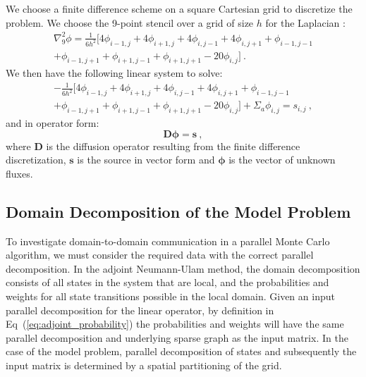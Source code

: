 \documentclass[preprint,11pt]{elsarticle}
\newcommand{\ve}[1]{\ensuremath{\mathbf{#1}}}
\begin{document}
We choose a finite difference scheme on a square Cartesian grid to discretize
the problem. We choose the 9-point stencil over a grid of size $h$ for the
Laplacian \cite{leveque_finite_2007}:
\begin{multline}
  \nabla^2_9\phi = \frac{1}{6h^2}[4 \phi_{i-1,j} + 4 \phi_{i+1,j}
    + 4 \phi_{i,j-1} + 4 \phi_{i,j+1} + \phi_{i-1,j-1}\\ +
    \phi_{i-1,j+1} + \phi_{i+1,j-1} + \phi_{i+1,j+1} - 20
    \phi_{i,j}]\:.
  \label{eq:nine_point_stencil}
\end{multline}
We then have the following linear system to solve:
\begin{multline}
  -\frac{1}{6h^2}[4 \phi_{i-1,j} + 4 \phi_{i+1,j} + 4
    \phi_{i,j-1} + 4 \phi_{i,j+1} + \phi_{i-1,j-1}\\ + \phi_{i-1,j+1}
    + \phi_{i+1,j-1} + \phi_{i+1,j+1} - 20 \phi_{i,j}] + \Sigma_a
  \phi_{i,j} = s_{i,j}\:,
  \label{eq:fd_system}
\end{multline}
and in operator form:
\begin{equation}
  \ve{D}\boldsymbol{\phi}=\ve{s}\:,
  \label{eq:operator_system}
\end{equation}
where $\ve{D}$ is the diffusion operator resulting from the finite difference
discretization, $\ve{s}$ is the source in vector form and $\boldsymbol{\phi}$
is the vector of unknown fluxes.

\subsection{Domain Decomposition of the Model Problem}
\label{subsec:model_problem_decomp}
To investigate domain-to-domain communication in a parallel Monte Carlo
algorithm, we must consider the required data with the correct parallel
decomposition. In the adjoint Neumann-Ulam method, the domain decomposition
consists of all states in the system that are local, and the probabilities and
weights for all state transitions possible in the local domain. Given an input
parallel decomposition for the linear operator, by definition in
Eq~(\ref{eq:adjoint_probability}) the probabilities and weights will have the
same parallel decomposition and underlying sparse graph as the input
matrix. In the case of the model problem, parallel decomposition of states and
subsequently the input matrix is determined by a spatial partitioning of the
grid.
\end{document}
